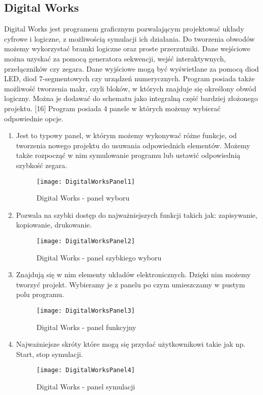 \documentclass[12pt, a4paper, onside, polish]{article}				%
\begin{document}
\subsection{Digital Works}
\hspace{\parindent}
Digital Works jest programem graficznym pozwalającym projektować układy cyfrowe i logiczne, z możliwością symulacji ich działania. Do tworzenia obwodów możemy wykorzystać bramki logiczne oraz proste przerzutniki. Dane wejściowe można uzyskać za pomocą generatora sekwencji, wejść interaktywnych, przełączników czy zegara. Dane wyjściowe mogą być wyświetlane za pomocą diod LED, diod 7-segmentowych czy urządzeń numerycznych. Program posiada także możliwość tworzenia makr, czyli bloków, w których znajduje się określony obwód logiczny. Można je dodawać do schematu jako integralną część bardziej złożonego projektu. [16]  \newline\newline
Program posiada 4 panele w których możemy wybierać odpowiednie opcje.
 \begin{enumerate}
\item Jest to typowy panel, w którym możemy wykonywać różne funkcje, od tworzenia nowego projektu do usuwania odpowiednich elementów. Możemy także rozpocząć w nim symulowanie programu lub ustawić odpowiednią szybkość zegara. 
  	\begin{figure}[H]
  	  {\centering \texttt{[image: DigitalWorksPanel1]} \caption{Digital Works - panel wyboru}}\vspace{5mm}
    	\end{figure}

\item Pozwala na szybki dostęp do najważniejszych funkcji takich jak: zapisywanie, kopiowanie, drukowanie.
	\begin{figure}[H]
  	  {\centering \texttt{[image: DigitalWorksPanel2]} \caption{Digital Works - panel szybkiego wyboru}}\vspace{5mm}
    	\end{figure}

\item Znajdują się w nim elementy układów elektronicznych. Dzięki nim możemy tworzyć projekt. Wybieramy je z panelu po czym umieszczamy w pustym polu programu. 
   	\begin{figure}[H]
  	  {\centering \texttt{[image: DigitalWorksPanel3]} \caption{Digital Works - panel funkcyjny}}\vspace{5mm}
    	\end{figure}

\item Najważniejsze skróty które mogą się przydać użytkownikowi takie jak np. Start, stop symulacji. 
   	\begin{figure}[H]
  	  {\centering \texttt{[image: DigitalWorksPanel4]} \caption{Digital Works - panel symulacji}}\vspace{5mm}
    	\end{figure}
\end{enumerate}
\end{document}
